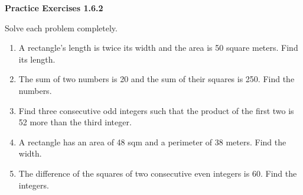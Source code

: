 \vspace{1ex}
\noindent\textbf{Practice Exercises 1.6.2}

\vspace{0.75ex}

Solve each problem completely.
\begin{enumerate}[label = \color{blue}\arabic*. ]
\item A rectangle's length is twice its width and the area is 50 square meters. Find its length. 
\item The sum of two numbers is 20 and the sum of their squares is 250. Find the numbers. 
\item Find three consecutive odd integers such that the product of the first two is 52 more than the third integer.
\item A rectangle has an area of 48 sqm and a perimeter of 38 meters. Find the width. 
\item The difference of the squares of two consecutive even integers is 60. Find the integers. 
\end{enumerate}


